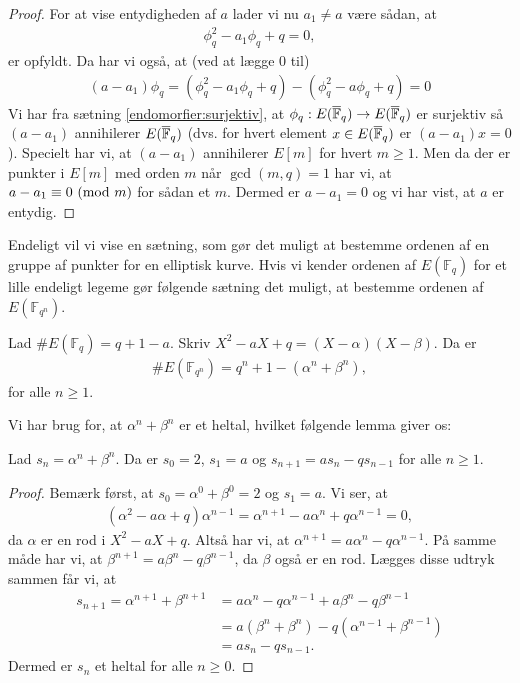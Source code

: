 \begin{proof}
For at vise entydigheden af $a$ lader vi nu $a_1 \neq a$ være sådan, at 
\begin{align*}
	\phi_{q}^{2} - a_1 \phi_q + q = 0,
\end{align*}
er opfyldt. Da har vi også, at (ved at lægge $0$ til)
\begin{align*}
	(a - a_1) \phi_q = (\phi_{q}^{2} - a_1 \phi_q + q) - (\phi_{q}^{2} - a\phi_q + q) = 0
\end{align*}
Vi har fra sætning \ref{endomorfier:surjektiv}, at $\phi_q : E(\overline{\mathbb{F}}_q) \to E(\overline{\mathbb{F}}_q)$ er surjektiv så $(a - a_1)$ annihilerer $E(\overline{\mathbb{F}}_q)$ (dvs. for hvert element $x \in E(\overline{\mathbb{F}}_q)$ er $(a-a_1)x = 0$). Specielt har vi, at $(a - a_1)$ annihilerer $E[m]$ for hvert $m \geq 1$. Men da der er punkter i $E[m]$ med orden $m$ når $\gcd(m, q) =1$ har vi, at $a - a_1 \equiv 0 \ (\mathrm{mod} \ m)$ for sådan et $m$. Dermed er $a - a_ 1 = 0$ og vi har vist, at $a$ er entydig.
\end{proof}

Endeligt vil vi vise en sætning, som gør det muligt at bestemme ordenen af en gruppe af punkter for en elliptisk kurve. Hvis vi kender ordenen af $E(\mathbb{F}_q)$ for et lille endeligt legeme gør følgende sætning det muligt, at bestemme ordenen af $E(\mathbb{F}_{q^n})$.

\begin{thm}
\label{count}
Lad $\#E(\mathbb{F}_q) = q + 1 - a$. Skriv $X^2 - aX + q= (X-\alpha)(X-\beta)$. Da er
\begin{align*}
	\#E(\mathbb{F}_{q^n}) = q^n + 1 - (\alpha^n + \beta^n),
\end{align*}
for alle $n \geq 1$.
\end{thm}
Vi har brug for, at $\alpha^n + \beta^n$ er et heltal, hvilket følgende lemma giver os:

\begin{lemma}
\label{endelige_legemer:recurrence}
Lad $s_n = \alpha^n + \beta^n$. Da er $s_0=2$, $s_1=a$ og $s_{n+1}=as_n - qs_{n-1}$ for alle $n \geq 1$.
\end{lemma}
\begin{proof}
Bemærk først, at $s_0 = \alpha^0 + \beta^0 = 2$ og $s_1 = a$.
Vi ser, at 
\begin{align*}
	(\alpha^2 - a\alpha + q) \alpha^{n-1} = \alpha^{n+1} - a \alpha^n + q\alpha^{n-1} = 0,
\end{align*}
da $\alpha$ er en rod i $X^2 - aX + q$. Altså har vi, at $\alpha^{n+1}=a \alpha^n - q\alpha^{n-1}$. På samme måde har vi, at $\beta^{n+1}=a \beta^n - q \beta^{n-1}$, da $\beta$ også er en rod. Lægges disse udtryk sammen får vi, at
\begin{align*}
	s_{n+1} = \alpha^{n+1} + \beta^{n+1} &= a \alpha^n - q \alpha^{n-1} + a \beta^n - q \beta^{n-1} \\
	&= a (\beta^n + \beta^n) - q (\alpha^{n-1} + \beta^{n-1}) \\
	&= a s_n - q s_{n-1}.
\end{align*}
Dermed er $s_n$ et heltal for alle $n \geq 0$.
\end{proof}

